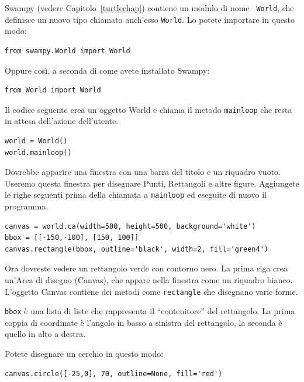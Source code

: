 \documentclass[10pt]{book}
\begin{document}
\begin{exercise}
\label{canvas}

Swampy (vedere Capitolo~\ref{turtlechap}) contiene un modulo di nome {\tt
  World}, che definisce un nuovo tipo chiamato anch'esso {\tt World}.
Lo potete importare in questo modo:

\begin{verbatim}
from swampy.World import World
\end{verbatim}

Oppure così, a seconda di come avete installato Swampy:

\begin{verbatim}
from World import World
\end{verbatim}

Il codice seguente crea un oggetto World e chiama il metodo {\tt mainloop} che resta in attesa dell'azione dell'utente.

\begin{verbatim}
world = World()
world.mainloop()
\end{verbatim}

Dovrebbe apparire una finestra con una barra del titolo e un riquadro vuoto. Useremo questa finestra per disegnare Punti, Rettangoli e altre figure. Aggiungete le righe seguenti prima della chiamata a \verb"mainloop" ed eseguite di nuovo il programma.

\begin{verbatim}
canvas = world.ca(width=500, height=500, background='white')
bbox = [[-150,-100], [150, 100]]
canvas.rectangle(bbox, outline='black', width=2, fill='green4')
\end{verbatim}

Ora dovreste vedere un rettangolo verde con contorno nero. La prima riga crea un'Area di disegno (Canvas), che appare nella finestra come un riquadro bianco. L'oggetto Canvas contiene dei metodi come {\tt rectangle} che disegnano varie forme.

{\tt bbox} è una lista di liste che rappresenta il ``contenitore''
del rettangolo. La prima coppia di coordinate è l'angolo in basso a sinistra del rettangolo, la seconda è quello in alto a destra.

Potete disegnare un cerchio in questo modo:

\begin{verbatim}
canvas.circle([-25,0], 70, outline=None, fill='red')
\end{verbatim}


\end{exercise}
\end{document}
